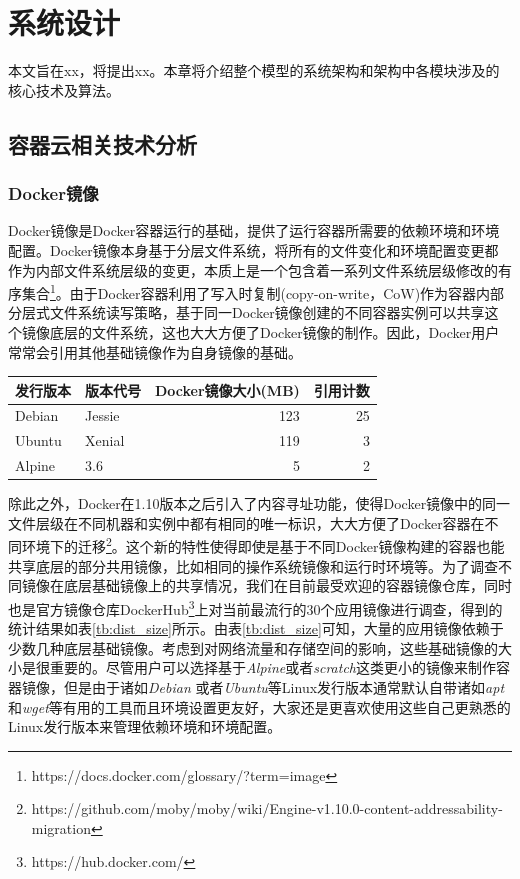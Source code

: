 
\chapter{系统设计}
\label{chap:sys_design}
本文旨在xx，将提出xx。本章将介绍整个模型的系统架构和架构中各模块涉及的核心技术及算法。
\section{容器云相关技术分析}
\subsection{Docker镜像}
Docker镜像是Docker容器运行的基础，提供了运行容器所需要的依赖环境和环境配置。Docker镜像本身基于分层文件系统，将所有的文件变化和环境配置变更都作为内部文件系统层级的变更，本质上是一个包含着一系列文件系统层级修改的有序集合\footnote{https://docs.docker.com/glossary/?term=image}。由于Docker容器利用了写入时复制(copy-on-write，CoW)作为容器内部分层式文件系统读写策略，基于同一Docker镜像创建的不同容器实例可以共享这个镜像底层的文件系统，这也大大方便了Docker镜像的制作。因此，Docker用户常常会引用其他基础镜像作为自身镜像的基础。

\begin{table}[h]
\centering
{}
\begin{tabular}{@{}llrr@{}}\toprule
 发行版本 & 版本代号 & Docker镜像大小(MB) & 引用计数 \\ \midrule
 Debian & Jessie & 123 & 25\\
 Ubuntu & Xenial & 119 & 3\\
 Alpine & 3.6 & 5 & 2\\ \bottomrule
\end{tabular}
\end{table}

除此之外，Docker在1.10版本之后引入了内容寻址功能，使得Docker镜像中的同一文件层级在不同机器和实例中都有相同的唯一标识，大大方便了Docker容器在不同环境下的迁移\footnote{https://github.com/moby/moby/wiki/Engine-v1.10.0-content-addressability-migration}。这个新的特性使得即使是基于不同Docker镜像构建的容器也能共享底层的部分共用镜像，比如相同的操作系统镜像和运行时环境等。为了调查不同镜像在底层基础镜像上的共享情况，我们在目前最受欢迎的容器镜像仓库，同时也是官方镜像仓库DockerHub\footnote{https://hub.docker.com/}上对当前最流行的30个应用镜像进行调查，得到的统计结果如表\ref{tb:dist_size}所示。由表\ref{tb:dist_size}可知，大量的应用镜像依赖于少数几种底层基础镜像。考虑到对网络流量和存储空间的影响，这些基础镜像的大小是很重要的。尽管用户可以选择基于\emph{Alpine}或者\emph{scratch}这类更小的镜像来制作容器镜像，但是由于诸如\emph{Debian} 或者\emph{Ubuntu}等Linux发行版本通常默认自带诸如\emph{apt}和\emph{wget}等有用的工具而且环境设置更友好，大家还是更喜欢使用这些自己更熟悉的Linux发行版本来管理依赖环境和环境配置。

